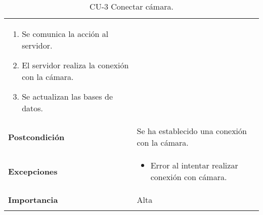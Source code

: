 \begin{longtable}[h!]{@{}ll@{}}
\begin{minipage}[t]{0.71\columnwidth}
\begin{enumerate}
\def\labelenumi{\arabic{enumi}.}
\tightlist
\item
  Se comunica la acción al servidor.
\item
  El servidor realiza la conexión con la cámara.
\item
  Se actualizan las bases de datos.
\end{enumerate}\strut
\end{minipage}\tabularnewline
\begin{minipage}[t]{0.23\columnwidth}\raggedright\strut
\textbf{Postcondición}\strut
\end{minipage} & \begin{minipage}[t]{0.71\columnwidth}\raggedright\strut
Se ha establecido una conexión con la cámara.\strut
\end{minipage}\tabularnewline
\begin{minipage}[t]{0.23\columnwidth}\raggedright\strut
\textbf{Excepciones}\strut
\end{minipage} & \begin{minipage}[t]{0.71\columnwidth}\raggedright\strut
\begin{itemize}
\tightlist
\item
  Error al intentar realizar conexión con cámara.
\end{itemize}\strut
\end{minipage}\tabularnewline
\begin{minipage}[t]{0.23\columnwidth}\raggedright\strut
\textbf{Importancia}\strut
\end{minipage} & \begin{minipage}[t]{0.71\columnwidth}\raggedright\strut
Alta\strut
\end{minipage}\tabularnewline
\bottomrule
\caption{CU-3 Conectar cámara.}
\end{longtable}


